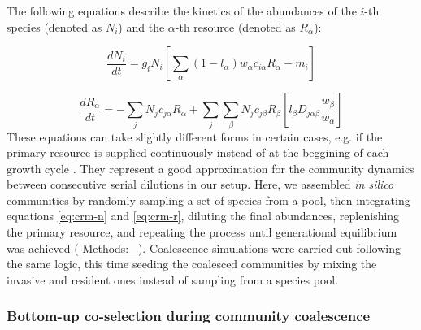 \documentclass[a4paper,10pt]{article}
\newcommand{\methodsref}[1]{%
  \hyperref[{methods:#1}]{%
   Methods:~\nameref*{methods:#1}%
  }%
}
\begin{document}
\begin{mdframed}
The following equations describe the kinetics of the abundances
of the $i$-th species (denoted as $N_i$)
and the $\alpha$-th resource (denoted as $R_\alpha$):

\begin{equation}
\frac{dN_i}{dt} = 
g_i N_i
\left[
\sum_\alpha \left( 1-l_\alpha \right)
w_\alpha c_{i\alpha} R_\alpha
- m_i
\right]
\label{eq:crm-n}
\end{equation}

\begin{equation}
\frac{dR_\alpha}{dt} = 
- \sum_j N_j c_{j\alpha} R_\alpha
+ \sum_j \sum_\beta N_j c_{j\beta} R_\beta
\left[
l_\beta D_{j\alpha\beta} \frac{w_\beta}{w_\alpha}
\right]
\label{eq:crm-r}
\end{equation}
%
These equations can take slightly different forms in certain cases,
e.g. if the primary resource is supplied continuously instead of at the beggining
of each growth cycle \cite{Marsland2019,Marsland2020}.
They represent a good approximation for the community dynamics between consecutive
serial dilutions in our setup.
Here, we assembled \textit{in silico} communities by randomly
sampling a set of species from a pool,
then integrating equations \ref{eq:crm-n} and \ref{eq:crm-r},
diluting the final abundances,
replenishing the primary resource,
and repeating the process until generational equilibrium was achieved
(\methodsref{sim}).
Coalescence simulations were carried out following the same logic,
this time seeding the coalesced communities by mixing the invasive and resident
ones instead of sampling from a species pool.

\bigskip
\end{mdframed}

\clearpage

\subsubsection*{Bottom-up co-selection during community coalescence}
\end{document}
